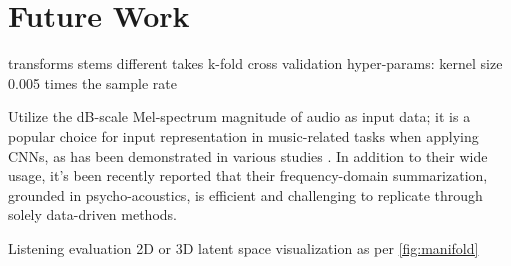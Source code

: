 \chapter{Future Work}



transforms
stems
different takes
k-fold cross validation
hyper-params: kernel size 0.005 times the sample rate

Utilize the dB-scale Mel-spectrum magnitude of audio as input data; it is a popular choice for input representation in music-related tasks when applying CNNs, as has been demonstrated in various studies \cite{Kim2020OneStrategies}. In addition to their wide usage, it's been recently reported that their frequency-domain summarization, grounded in psycho-acoustics, is efficient and challenging to replicate through solely data-driven methods. \cite{Kim2020OneStrategies}

Listening evaluation
2D or 3D latent space visualization as per \ref{fig:manifold}



\newpage